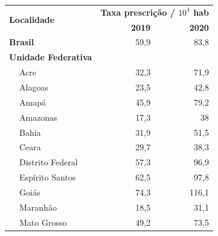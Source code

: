\begin{table}[!htbp]
    \centering
\begin{tabular}{llrr}
    \hline
    \multicolumn{2}{l}{\multirow{2}{*}{\textbf{Localidade}}} & \multicolumn{2}{l}{\textbf{Taxa prescrição / $10^4$ hab}} \\ \cline{3-4} 
    \multicolumn{2}{l}{}                                     & \textbf{2019}              & \textbf{2020}              \\ \hline
    \multicolumn{2}{l}{\textbf{Brasil}}                      & 59,9                       & 83,8                       \\
    \multicolumn{2}{l}{\textbf{Unidade Federativa}}          &                            &                            \\
                      & Acre                                 & 32,3                       & 71,9                       \\
                      & Alagoas                              & 23,5                       & 42,8                       \\
                      & Amapá                                & 45,9                       & 79,2                       \\
                      & Amazonas                             & 17,3                       & 38                         \\
                      & Bahia                                & 31,9                       & 51,5                       \\
                      & Ceara                                & 29,7                       & 38,3                       \\
                      & Distrito Federal                     & 57,3                       & 96,9                       \\
                      & Espírito Santos                      & 62,5                       & 97,8                       \\
                      & Goiás                                & 74,3                       & 116,1                      \\
                      & Maranhão                             & 18,5                       & 31,1                       \\
                      & Mato Grosso                          & 49,2                       & 73,5                       \\

\end{tabular}
\end{table}

